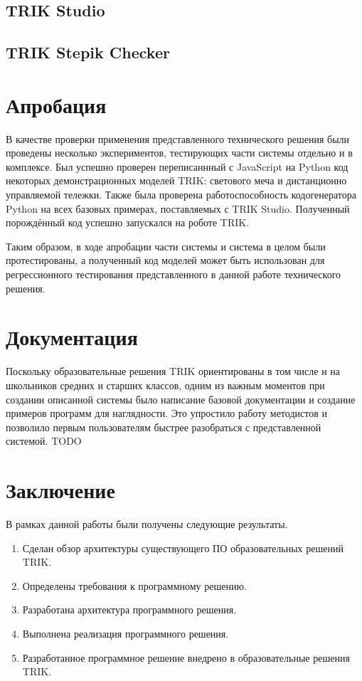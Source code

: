 \documentclass[14pt]{matmex-diploma-custom}
\begin{document}
\subsection{TRIK Studio}

\subsection{TRIK Stepik Checker}



\section{Апробация}
В качестве проверки применения представленного технического решения были проведены несколько экспериментов, тестирующих части системы отдельно и в комплексе. Был успешно проверен переписаннный с JavaScript на Python код некоторых демонстрационных моделей TRIK: светового меча и дистанционно управляемой тележки. Также была проверена работоспособность кодогенератора Python на всех базовых примерах, поставляемых с TRIK Studio. Полученный порождённый код успешно запускался на роботе TRIK. 

Таким образом, в ходе апробации части системы и система в целом были протестированы, а полученный код моделей может быть использован для регрессионного тестирования представленного в данной работе технического решения.

\section{Документация}
Поскольку образовательные решения TRIK ориентированы в том числе и на школьников средних и старших классов, одним из важным моментов при создании описанной системы было написание базовой документации и создание примеров программ для наглядности. Это упростило работу методистов и позволило первым пользователям быстрее разобраться с представленной системой. TODO


\section*{Заключение}

В рамках данной работы были получены следующие результаты.
\begin{enumerate}
\item Сделан обзор архитектуры существующего ПО образовательных решений TRIK.
\item Определены требования к программному решению.
\item Разработана архитектура программного решения.
\item Выполнена реализация программного решения.
\item Разработанное программное решение внедрено в образовательные решения TRIK.
\end{enumerate}
\end{document}
